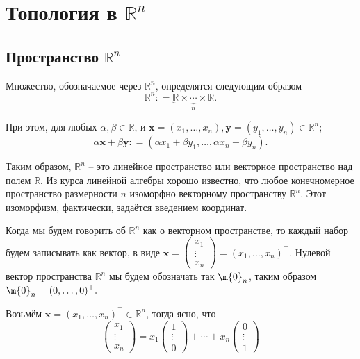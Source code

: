 \chapter{Топология в $\mathbb{R}^n$}

\section{Пространство $\mathbb{R}^n$}

\begin{definition}
    
Множество, обозначаемое через $\mathbb{R}^n$, определятся следующим образом
\[
 \mathbb{R}^n: = \underbrace{\mathbb{R} \times \cdots \times  \mathbb{R}}_n.
\]

При этом, для любых $\alpha,\beta \in \mathbb{R}$, и $\mathbf{x}=(x_1,\ldots, x_n), \mathbf{y} = (y_1,\ldots, y_n) \in \mathbb{R}^n$;
\[
 \alpha \mathbf{x} + \beta \mathbf{y}: = (\alpha x_1 + \beta y_1, \ldots, \alpha x_n + \beta y_n). 
\]
\end{definition}


Таким образом, $\mathbb{R}^n$ -- это линейное пространство или векторное пространство над полем $\mathbb{R}$. Из курса линейной алгебры хорошо известно, что любое конечномерное пространство размерности $n$ изоморфно векторному пространству $\mathbb{R}^n$. Этот изоморфизм, фактически, задаётся введением координат.

Когда мы будем говорить об $\mathbb{R}^n$ как о векторном пространстве, то каждый набор будем записывать как вектор, \ie в виде $\mathbf{x} = \begin{pmatrix} x_1 \\ \vdots \\ x_n \end{pmatrix} = (x_1,\ldots, x_n)^\top.$ Нулевой вектор пространства $\mathbb{R}^n$ мы будем обозначать так $\m{0}_n$, таким образом $\m{0}_n = (0,\ldots, 0)^\top.$

Возьмём $\mathbf{x} = (x_1,\ldots, x_n)^\top \in \mathbb{R}^n$, тогда ясно, что 
\[
\begin{pmatrix}
    x_1 \\ \vdots \\x_n 
\end{pmatrix} = x_1 \begin{pmatrix}
    1 \\ \vdots \\ 0
\end{pmatrix} + \cdots + x_n \begin{pmatrix}
    0 \\ \vdots \\1
\end{pmatrix}
\]

